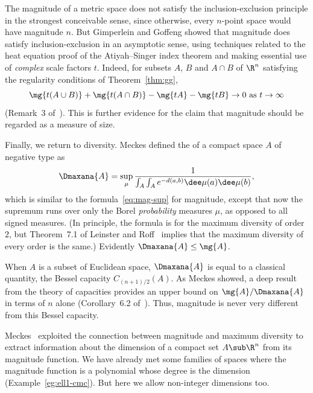 The magnitude of a metric space does not satisfy the inclusion-exclusion
principle in the strongest conceivable sense, since otherwise, every
$n$-point space would have magnitude $n$.  But Gimperlein and Goffeng
showed that magnitude does satisfy inclusion-exclusion in an asymptotic
sense, using techniques related to the heat equation proof of the
Atiyah--Singer
%
% 
index theorem and making essential use of \emph{complex} scale factors $t$.
Indeed, for subsets $A$, $B$ and $A \cap B$ of $\R^n$ satisfying the
regularity conditions of Theorem~\ref{thm:gg},
\[
\index{Gimperlein, Heiko}%
\index{Goffeng, Magnus}%
\index{inclusion-exclusion principle!asymptotic}%
\index{magnitude!inclusion-exclusion for}
\mg{t(A \cup B)} + \mg{t(A \cap B)} - \mg{tA} - \mg{tB}
\to 0
\text{ as } t \to \infty
\]
(Remark~3 of~\cite{GiGo}).  This is further evidence for the claim that
magnitude should be regarded as a measure of size.

Finally, we return to diversity.  Meckes%
%
%  
defined the  of a compact space $A$ of negative type as
\[
\Dmaxana{A}
=
\sup_\mu
\frac{1}{\int_A \int_A e^{-d(a, b)} \dee\mu(a) \dee\mu(b)},
\]
which is similar to the formula~\eqref{eq:mag-sup} for magnitude, except
that now the supremum runs over only the Borel \emph{probability} measures
$\mu$, as opposed to all signed measures.  (In principle, the formula is
for the maximum diversity of order $2$, but Theorem~7.1 of Leinster and
Roff~\cite{MEMS} implies that the maximum diversity of every order is the same.)
Evidently $\Dmaxana{A} \leq \mg{A}$.

When $A$ is a subset of Euclidean space, $\Dmaxana{A}$ is equal to a
classical quantity, the Bessel%
% 
% 
capacity%
% 
% 
$C_{(n + 1)/2}(A)$.  As Meckes%
%
%  
showed, a deep result from the theory of capacities provides an upper bound
on $\mg{A}/\Dmaxana{A}$%
% 
%
% 
in terms of $n$ alone (Corollary~6.2 of~\cite{MeckMDC}).
% 
% 
Thus, magnitude is never very different from this Bessel capacity.

Meckes~\cite{MeckMDC} exploited the connection between magnitude and
maximum diversity to extract information about the dimension of a compact
set $A \sub \R^n$ from its magnitude function.  We have already met some
families of spaces where the magnitude function is a polynomial whose
degree is the dimension (Example~\ref{eg:ell1-cmc}).  But here we allow
non-integer dimensions too.

